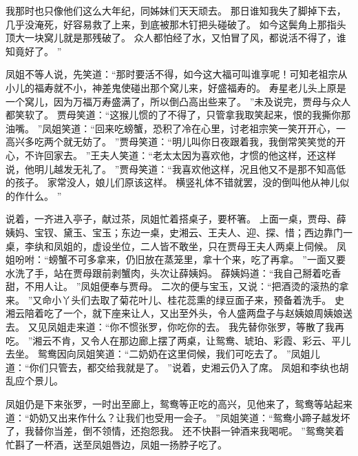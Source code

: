 我那时也只像他们这么大年纪，同姊妹们天天顽去。
那日谁知我失了脚掉下去，几乎没淹死，好容易救了上来，到底被那木钉把头碰破了。
如今这鬓角上那指头顶大一块窝儿就是那残破了。
众人都怕经了水，又怕冒了风，都说活不得了，谁知竟好了。
”\par
凤姐不等人说，先笑道：“那时要活不得，如今这大福可叫谁享呢！可知老祖宗从小儿的福寿就不小，神差鬼使碰出那个窝儿来，好盛福寿的。
寿星老儿头上原是一个窝儿，因为万福万寿盛满了，所以倒凸高出些来了。
”未及说完，贾母与众人都笑软了。
贾母笑道：“这猴儿惯的了不得了，只管拿我取笑起来，恨的我撕你那油嘴。
”凤姐笑道：“回来吃螃蟹，恐积了冷在心里，讨老祖宗笑一笑开开心，一高兴多吃两个就无妨了。
”贾母笑道：“明儿叫你日夜跟着我，我倒常笑笑觉的开心，不许回家去。
”王夫人笑道：“老太太因为喜欢他，才惯的他这样，还这样说，他明儿越发无礼了。
”贾母笑道：“我喜欢他这样，况且他又不是那不知高低的孩子。
家常没人，娘儿们原该这样。
横竖礼体不错就罢，没的倒叫他从神儿似的作什么。
”
\par
说着，一齐进入亭子，献过茶，凤姐忙着搭桌子，要杯箸。
上面一桌，贾母、薛姨妈、宝钗、黛玉、宝玉；东边一桌，史湘云、王夫人、迎、探、惜；西边靠门一桌，李纨和凤姐的，虚设坐位，二人皆不敢坐，只在贾母王夫人两桌上伺候。
凤姐吩咐：“螃蟹不可多拿来，仍旧放在蒸笼里，拿十个来，吃了再拿。
”一面又要水洗了手，站在贾母跟前剥蟹肉，头次让薛姨妈。
薛姨妈道：“我自己掰着吃香甜，不用人让。
”凤姐便奉与贾母。
二次的便与宝玉，又说：“把酒烫的滚热的拿来。
”又命小丫头们去取了菊花叶儿、桂花蕊熏的绿豆面子来，预备着洗手。
史湘云陪着吃了一个，就下座来让人，又出至外头，令人盛两盘子与赵姨娘周姨娘送去。
又见凤姐走来道：“你不惯张罗，你吃你的去。
我先替你张罗，等散了我再吃。
”湘云不肯，又令人在那边廊上摆了两桌，让鸳鸯、琥珀、彩霞、彩云、平儿去坐。
鸳鸯因向凤姐笑道：“二奶奶在这里伺候，我们可吃去了。
”凤姐儿道：“你们只管去，都交给我就是了。
”说着，史湘云仍入了席。
凤姐和李纨也胡乱应个景儿。
\par
凤姐仍是下来张罗，一时出至廊上，鸳鸯等正吃的高兴，见他来了，鸳鸯等站起来道：“奶奶又出来作什么？让我们也受用一会子。
”凤姐笑道：“鸳鸯小蹄子越发坏了，我替你当差，倒不领情，还抱怨我。
还不快斟一钟酒来我喝呢。
”鸳鸯笑着忙斟了一杯酒，送至凤姐唇边，凤姐一扬脖子吃了。
